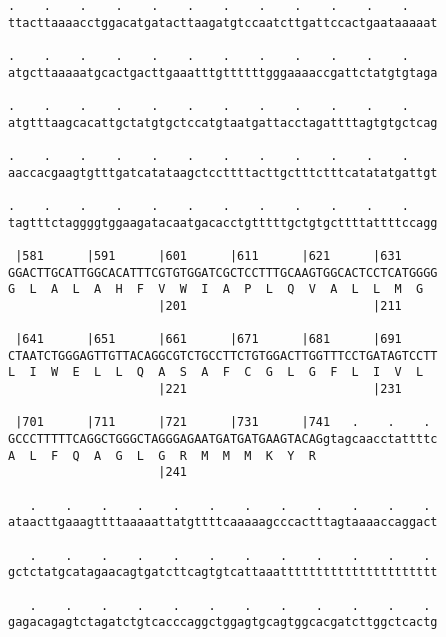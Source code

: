 \documentclass{article}
\begin{document}
\begin{Verbatim}
.    .    .    .    .    .    .    .    .    .    .    .    
ttacttaaaacctggacatgatacttaagatgtccaatcttgattccactgaataaaaat
                                                            
.    .    .    .    .    .    .    .    .    .    .    .    
atgcttaaaaatgcactgacttgaaatttgttttttgggaaaaccgattctatgtgtaga
                                                            
.    .    .    .    .    .    .    .    .    .    .    .    
atgtttaagcacattgctatgtgctccatgtaatgattacctagattttagtgtgctcag
                                                            
.    .    .    .    .    .    .    .    .    .    .    .    
aaccacgaagtgtttgatcatataagctccttttacttgctttctttcatatatgattgt
                                                            
.    .    .    .    .    .    .    .    .    .    .    .    
tagtttctaggggtggaagatacaatgacacctgtttttgctgtgcttttattttccagg
                                                            
 |581      |591      |601      |611      |621      |631     
GGACTTGCATTGGCACATTTCGTGTGGATCGCTCCTTTGCAAGTGGCACTCCTCATGGGG
G  L  A  L  A  H  F  V  W  I  A  P  L  Q  V  A  L  L  M  G  
                     |201                          |211     
  
 |641      |651      |661      |671      |681      |691     
CTAATCTGGGAGTTGTTACAGGCGTCTGCCTTCTGTGGACTTGGTTTCCTGATAGTCCTT
L  I  W  E  L  L  Q  A  S  A  F  C  G  L  G  F  L  I  V  L  
                     |221                          |231     
  
 |701      |711      |721      |731      |741   .    .    . 
GCCCTTTTTCAGGCTGGGCTAGGGAGAATGATGATGAAGTACAGgtagcaacctattttc
A  L  F  Q  A  G  L  G  R  M  M  M  K  Y  R                 
                     |241                                   
  
   .    .    .    .    .    .    .    .    .    .    .    . 
ataacttgaaagttttaaaaattatgttttcaaaaagcccactttagtaaaaccaggact
                                                            
   .    .    .    .    .    .    .    .    .    .    .    . 
gctctatgcatagaacagtgatcttcagtgtcattaaatttttttttttttttttttttt
                                                            
   .    .    .    .    .    .    .    .    .    .    .    . 
gagacagagtctagatctgtcacccaggctggagtgcagtggcacgatcttggctcactg
                                                            

\end{Verbatim}
\end{document}
